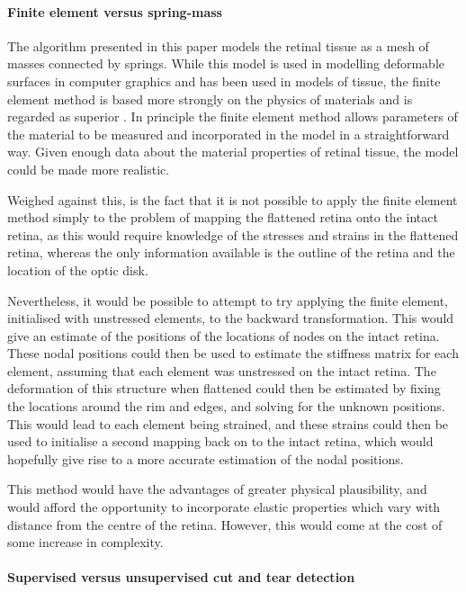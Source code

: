 \documentclass[10pt]{article}
\begin{document}
\paragraph{Finite element versus spring-mass}
\label{fold-sphere:sec:finite-elem-vers}

The algorithm presented in this paper models the retinal tissue as a
mesh of masses connected by springs. While this model is used in
modelling deformable surfaces in computer graphics and has been used
in models of tissue, the finite element method is based more strongly
on the physics of materials and is regarded as superior
\cite{CartEtal05appl}. In principle the finite element method allows
parameters of the material to be measured and incorporated in the
model in a straightforward way. Given enough data about
the material properties of retinal tissue, the model could be made
more realistic. 

Weighed against this, is the fact that it is not possible to apply the
finite element method simply to the problem of mapping the flattened
retina onto the intact retina, as this would require knowledge of the
stresses and strains in the flattened retina, whereas the only
information available is the outline of the retina and the location of
the optic disk. 

Nevertheless, it would be possible to attempt to try applying the
finite element, initialised with unstressed elements, to the backward
transformation. This would give an estimate of the positions of the
locations of nodes on the intact retina. These nodal positions could
then be used to estimate the stiffness matrix for each element,
assuming that each element was unstressed on the intact retina. The
deformation of this structure when flattened could then be estimated
by fixing the locations around the rim and edges, and solving for the
unknown positions. This would lead to each element being strained, and
these strains could then be used to initialise a second mapping back
on to the intact retina, which would hopefully give rise to a more
accurate estimation of the nodal positions. 

This method would have the advantages of greater physical plausibility,
and would afford the opportunity to incorporate elastic properties
which vary with distance from the centre of the retina. However, this
would come at the cost of some increase in complexity.

\paragraph{Supervised versus unsupervised cut and tear detection}
\label{fold-sphere:sec:superv-vers-unsup}
\end{document}
